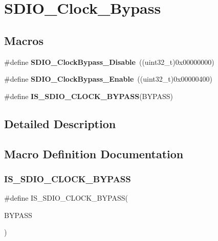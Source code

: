 \section{S\+D\+I\+O\+\_\+\+Clock\+\_\+\+Bypass}
\label{group__SDIO__Clock__Bypass}
\subsection*{Macros}
\begin{DoxyCompactItemize}
\item 
\#define \textbf{ S\+D\+I\+O\+\_\+\+Clock\+Bypass\+\_\+\+Disable}~((uint32\+\_\+t)0x00000000)
\item 
\#define \textbf{ S\+D\+I\+O\+\_\+\+Clock\+Bypass\+\_\+\+Enable}~((uint32\+\_\+t)0x00000400)
\item 
\#define \textbf{ I\+S\+\_\+\+S\+D\+I\+O\+\_\+\+C\+L\+O\+C\+K\+\_\+\+B\+Y\+P\+A\+SS}(B\+Y\+P\+A\+SS)
\end{DoxyCompactItemize}


\subsection{Detailed Description}


\subsection{Macro Definition Documentation}
\mbox{\label{group__SDIO__Clock__Bypass_ga5d5a2fcdd3150e4a89c5aa1efd738dec}} 
\subsubsection{I\+S\+\_\+\+S\+D\+I\+O\+\_\+\+C\+L\+O\+C\+K\+\_\+\+B\+Y\+P\+A\+SS}
{\footnotesize\ttfamily \#define I\+S\+\_\+\+S\+D\+I\+O\+\_\+\+C\+L\+O\+C\+K\+\_\+\+B\+Y\+P\+A\+SS(\begin{DoxyParamCaption}\item[{}]{B\+Y\+P\+A\+SS }\end{DoxyParamCaption})}

